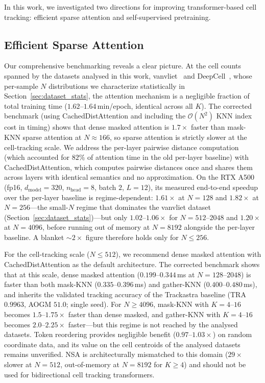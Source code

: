 In this work, we investigated two directions for improving transformer-based cell tracking: efficient sparse attention and self-supervised pretraining.

\subsection{Efficient Sparse Attention}

Our comprehensive benchmarking reveals a clear picture. At the cell counts spanned by the datasets analysed in this work, vanvliet~\cite{vanvliet2018} and DeepCell~\cite{schwartz2023}, whose per-sample $N$ distributions we characterize statistically in Section~\ref{sec:dataset_stats}, the attention mechanism is a negligible fraction of total training time ($1.62$--$1.64$\,min/epoch, identical across all $K$). The corrected benchmark (using CachedDistAttention and including the $\mathcal{O}(N^2)$ KNN index cost in timing) shows that dense masked attention is $1.7\times$ faster than mask-KNN sparse attention at $N \approx 166$, so sparse attention is strictly slower at the cell-tracking scale. We address the per-layer pairwise distance computation (which accounted for $82\%$ of attention time in the old per-layer baseline) with CachedDistAttention, which computes pairwise distances once and shares them across layers with identical semantics and no approximation. On the RTX A500 (fp16, $d_{\text{model}}=320$, $n_{\text{head}}=8$, batch $2$, $L=12$), its measured end-to-end speedup over the per-layer baseline is regime-dependent: $1.61\times$ at $N=128$ and $1.82\times$ at $N=256$---the small-$N$ regime that dominates the vanvliet dataset (Section~\ref{sec:dataset_stats})---but only $1.02$--$1.06\times$ for $N=512$--$2048$ and $1.20\times$ at $N=4096$, before running out of memory at $N=8192$ alongside the per-layer baseline. A blanket $\sim 2\times$ figure therefore holds only for $N \leq 256$.

For the cell-tracking scale ($N \leq 512$), we recommend dense masked attention with CachedDistAttention as the default architecture. The corrected benchmark shows that at this scale, dense masked attention ($0.199$--$0.344$\,ms at $N = 128$--$2048$) is faster than both mask-KNN ($0.335$--$0.396$\,ms) and gather-KNN ($0.400$--$0.480$\,ms), and inherits the validated tracking accuracy of the Trackastra baseline (TRA $0.9963$, AOGM $51.0$; single seed). For $N \geq 4096$, mask-KNN with $K=4$--$16$ becomes $1.5$--$1.75\times$ faster than dense masked, and gather-KNN with $K=4$--$16$ becomes $2.0$--$2.25\times$ faster---but this regime is not reached by the analysed datasets. Token reordering provides negligible benefit ($0.97$--$1.03\times$) on random coordinate data, and its value on the cell centroids of the analysed datasets remains unverified. NSA is architecturally mismatched to this domain ($29\times$ slower at $N=512$, out-of-memory at $N=8192$ for $K \geq 4$) and should not be used for bidirectional cell tracking transformers.

